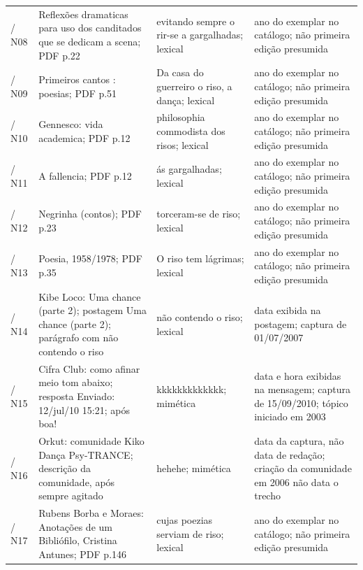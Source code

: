 \begin{longtable}{>{\raggedright\arraybackslash}p{}>{\raggedright\arraybackslash}p{}>{\raggedright\arraybackslash}p{}>{\raggedright\arraybackslash}p{}}
1837 / N08 & Reflexões dramaticas para uso dos canditados que se dedicam a scena; PDF p.22 \cite{r4reflexoesdramaticas} & evitando sempre o rir-se a gargalhadas; lexical & ano do exemplar no catálogo; não primeira edição presumida\\
1846 / N09 & Primeiros cantos : poesias; PDF p.51 \cite{r4primeiroscantos} & Da casa do guerreiro o riso, a dança; lexical & ano do exemplar no catálogo; não primeira edição presumida\\
1866 / N10 & Gennesco: vida academica; PDF p.12 \cite{r4gennesco} & philosophia commodista dos risos; lexical & ano do exemplar no catálogo; não primeira edição presumida\\
1902 / N11 & A fallencia; PDF p.12 \cite{r4afallencia} & ás gargalhadas; lexical & ano do exemplar no catálogo; não primeira edição presumida\\
1920 / N12 & Negrinha (contos); PDF p.23 \cite{r4negrinha} & torceram-se de riso; lexical & ano do exemplar no catálogo; não primeira edição presumida\\
1980 / N13 & Poesia, 1958/1978; PDF p.35 \cite{r4poesia19581978} & O riso tem lágrimas; lexical & ano do exemplar no catálogo; não primeira edição presumida\\
2007 / N14 & Kibe Loco: Uma chance (parte 2); postagem Uma chance (parte 2); parágrafo com não contendo o riso \cite{r4kibeloco} & não contendo o riso; lexical & data exibida na postagem; captura de 01/07/2007\\
2010 / N15 & Cifra Club: como afinar meio tom abaixo; resposta Enviado: 12/jul/10 15:21; após boa! \cite{r4forumcifraclub} & kkkkkkkkkkkkk; mimética & data e hora exibidas na mensagem; captura de 15/09/2010; tópico iniciado em 2003\\
2014 / N16 & Orkut: comunidade Kiko Dança Psy-TRANCE; descrição da comunidade, após sempre agitado \cite{r4orkutcomunidades} & hehehe; mimética & data da captura, não data de redação; criação da comunidade em 2006 não data o trecho\\
2017 / N17 & Rubens Borba e Moraes: Anotações de um Bibliófilo, Cristina Antunes; PDF p.146 \cite{r4rubensborbamoraesanotacoesbibliofilo} & cujas poezias serviam de riso; lexical & ano do exemplar no catálogo; não primeira edição presumida\\
\bottomrule\end{longtable}\normalsize

